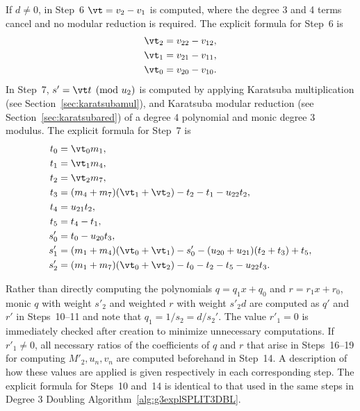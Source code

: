 If $d \neq 0$, in Step~6  $\vt = v_2 - v_1$ is computed, where the degree 3
and 4 terms cancel and no modular reduction is required. The explicit formula
for Step~6 is
\begin{align*}
    \vt_2 &= v_{22} - v_{12},\\
    \vt_1 &= v_{21} - v_{11},\\ 
    \vt_0 &= v_{20} - v_{10}.
\end{align*}
In Step~7, $s' = \vt t \pmod{u_2}$ is computed by applying Karatsuba
multiplication (see Section~\ref{sec:karatsubamul}), and Karatsuba modular
reduction (see Section~\ref{sec:karatsubared}) of a degree 4 polynomial and
monic degree 3 modulus. The explicit formula for Step~7 is
\begin{align*}
    t_0 &= \vt_0m_1,\\
    t_1 &= \vt_1m_4,\\
    t_2 &= \vt_2m_7,\\
    t_3 &= (m_4 + m_7)(\vt_1 + \vt_2) - t_2 - t_1 - u_{22}t_2,\\
    t_4 &= u_{21}t_2,\\
    t_5 &= t_4 - t_1,\\
    s_0' &= t_0 - u_{20}t_3,\\
    s_1' &= (m_1 + m_4)(\vt_0 + \vt_1) - s_0' - (u_{20} + u_{21})(t_2 + t_3) + t_5,\\
    s_2' &= (m_1 + m_7)(\vt_0 + \vt_2) - t_0 - t_2 - t_5 - u_{22}t_3.
\end{align*}

Rather than directly computing the polynomials $q = q_1x + q_0$ and $r = r_1x +
r_0$, monic $q$ with weight $s'_2$ and weighted $r$ with weight $s'_2d$ are
computed as $q'$ and $r'$ in Steps~10--11 and note that $q_1 = 1/s_2 = d/s_2'$.
The value $r'_1=0$ is immediately checked after creation to minimize unnecessary
computations. If $r'_1 \neq 0$, all necessary ratios of the coefficients of $q$
and $r$ that arise in Steps~16--19 for computing $M'_2,u_n,v_n$ are computed
beforehand in Step~14. A description of how these values are applied is given
respectively in each corresponding step. The explicit formula for Steps~10
and~14 is identical to that used in the same steps in Degree 3 Doubling
Algorithm~\ref{alg:g3explSPLIT3DBL}. 

